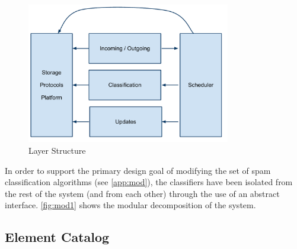 \documentclass[letterpaper,11pt]{article}
\begin{document}
\begin{figure}[h]
  \centering
  \includegraphics[width=3.5in]{ArchUses.pdf}
  \caption{Layer Structure}
  \label{fig:layer1}
\end{figure}

In order to support the primary design goal of modifying the set of spam
classification algorithms (see \autoref{app:mod}), the classifiers have been
isolated from the rest of the system (and from each other) through the use of
an abstract interface.  \autoref{fig:mod1} shows the modular decomposition of
the system.

\subsection{Element Catalog}
\end{document}

